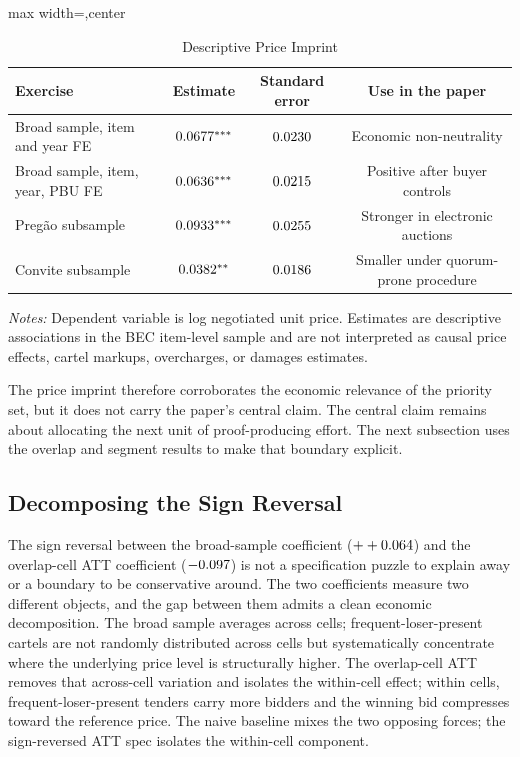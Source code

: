 \begin{table}[htbp]
\centering
\caption{Descriptive Price Imprint}
\label{tab:price_imprint_submission}
\footnotesize
\begin{adjustbox}{max width=\textwidth,center}
\begin{threeparttable}
\begin{tabular}{p{5.4cm}ccc}
\toprule
Exercise & Estimate & Standard error & Use in the paper \\
\midrule
Broad sample, item and year FE & $0.0677^{***}$ &
$0.0230$ & Economic non-neutrality \\
Broad sample, item, year, PBU FE & $0.0636^{***}$ &
$0.0215$ & Positive after buyer controls \\
Pregão subsample & $0.0933^{***}$ &
$0.0255$ & Stronger in electronic auctions \\
Convite subsample & $0.0382^{**}$ &
$0.0186$ & Smaller under quorum-prone procedure \\
\bottomrule
\end{tabular}
\begin{tablenotes}
\footnotesize
\item \textit{Notes:} Dependent variable is log negotiated unit
price. Estimates are descriptive associations in the BEC
item-level sample and are not interpreted as causal price
effects, cartel markups, overcharges, or damages estimates.
\end{tablenotes}
\end{threeparttable}
\end{adjustbox}
\end{table}

The price imprint therefore corroborates the economic relevance
of the priority set, but it does not carry the paper's central
claim. The central claim remains about allocating the next unit
of proof-producing effort. The next subsection uses the overlap
and segment results to make that boundary explicit.

\subsection{Decomposing the Sign Reversal}
\label{sec:price_scope_submission}

The sign reversal between the broad-sample coefficient
($++0.064$) and the overlap-cell ATT coefficient
($-0.097$) is not a specification puzzle to
explain away or a boundary to be conservative around. The two
coefficients measure two different objects, and the gap between
them admits a clean economic decomposition. The broad sample
averages across cells; frequent-loser-present cartels are not
randomly distributed across cells but systematically concentrate
where the underlying price level is structurally higher. The
overlap-cell ATT removes that across-cell variation and isolates
the within-cell effect; within cells, frequent-loser-present
tenders carry more bidders and the winning bid compresses toward
the reference price. The naive baseline mixes the two opposing
forces; the sign-reversed ATT spec isolates the within-cell
component.

